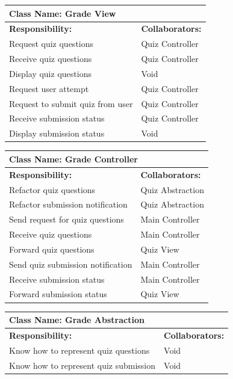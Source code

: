\documentclass[]{article}
\begin{document}
	\begin{table}[H]
	\centering
		\begin{tabular}{|p{9cm}|p{3cm}|}
		\hline
		 \multicolumn{2}{|l|}{\textbf{Class Name: Grade View}} \\
		\hline
		\textbf{Responsibility:} & \textbf{Collaborators:} \\
		\hline
		Request quiz questions & Quiz Controller\\
		\hline
	    Receive quiz questions & Quiz Controller\\
	    \hline
	    Display quiz questions & Void\\
	    \hline 
	    Request user attempt & Quiz Controller\\
	    \hline
	    Request to submit quiz from user& Quiz Controller\\
	    \hline
	    Receive submission status & Quiz Controller\\
	    \hline
	    Display submission status & Void\\
	    \hline
		\end{tabular}
	\end{table}
	
	\begin{table}[H]
	\centering
		\begin{tabular}{|p{9cm}|p{3cm}|}
		\hline
		 \multicolumn{2}{|l|}{\textbf{Class Name: Grade Controller}} \\
		\hline
		\textbf{Responsibility:} & \textbf{Collaborators:} \\
		\hline
	    Refactor quiz questions & Quiz Abstraction\\
		\hline
		Refactor submission notification & Quiz Abstraction\\
		\hline
	    Send request for quiz questions & Main Controller\\
		\hline
		Receive quiz questions & Main Controller\\
		\hline
		Forward quiz questions & Quiz View\\
		\hline
		Send quiz submission notification & Main Controller\\
		\hline
		Receive submission status & Main Controller\\
		\hline
		Forward submission status & Quiz View\\
		\hline
		\end{tabular}
	\end{table}
	
	\begin{table}[H]
	\centering
		\begin{tabular}{|p{9cm}|p{3cm}|}
		\hline
		 \multicolumn{2}{|l|}{\textbf{Class Name: Grade Abstraction}} \\
		\hline
		\textbf{Responsibility:} & \textbf{Collaborators:} \\
		\hline
	    Know how to represent quiz questions  & Void\\
		\hline
		Know how to represent quiz submission & Void\\
		\hline
		\end{tabular}
	\end{table}
\end{document}
